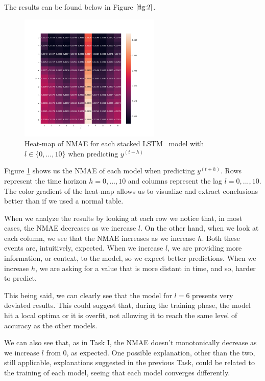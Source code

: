 \documentclass[10pt]{article}
\begin{document}
The results can be found below in Figure $\ref{fig:2}$.

\begin{figure}[!ht]
    \centering
    \includegraphics[width=0.6\textwidth,height=\textheight,keepaspectratio]{../result/project2/lstm_nmae_heatmap.png}
    \caption{Heat-map of \textsc{NMAE} for each stacked LSTM~\cite{SLSTM} model with $l\in\{0,...,10\}$ when predicting $y^{(t+h)}$}
    \label{fig:2}
\end{figure}


Figure \ref{fig:2} shows us the \textsc{NMAE} of each model when predicting $y^{(t+h)}$. Rows represent the time horizon $h = 0,...,10$ and columns represent the lag $l = 0,...,10$. The color gradient of the heat-map allows us to visualize and extract conclusions better than if we used a normal table.

When we analyze the results by looking at each row we notice that, in most cases, the \textsc{NMAE} decreases as we increase $l$. On the other hand, when we look at each column, we see that the \textsc{NMAE} increases as we increase $h$. Both these events are, intuitively, expected. When we increase $l$, we are providing more information, or context, to the model, so we expect better predictions. When we increase $h$, we are asking for a value that is more distant in time, and so, harder to predict.

This being said, we can clearly see that the model for $l = 6$ presents very deviated results. This could suggest that, during the training phase, the model hit a local optima or it is overfit, not allowing it to reach the same level of accuracy as the other models.

We can also see that, as in Task I, the \textsc{NMAE} doesn't monotonically decrease as we increase $l$ from 0, as expected. One possible explanation, other than the two, still applicable, explanations suggested in the previous Task, could be related to the training of each model, seeing that each model converges differently.
\end{document}

